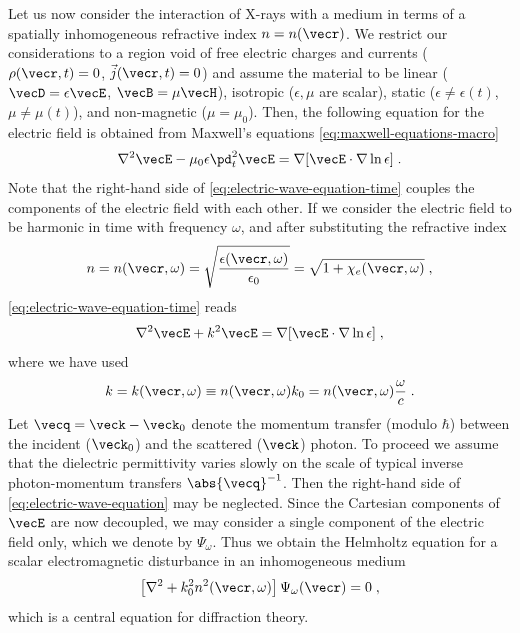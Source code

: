 \documentclass[
twoside,
openright,
titlepage,
numbers=noenddot,
headinclude,
fleqn,
a4paper,
footinclude=true,
cleardoublepage=empty,
abstractoff,
BCOR=5mm,
paper=a4,
fontsize=11pt,
british,ngerman,american,
]{scrreprt}
\begin{document}
Let us now consider the interaction of X-rays with a medium in terms
of a spatially inhomogeneous refractive index $n=n(\vecr)$.  We
restrict our considerations to a region void of free electric charges
and currents ($\rho(\vecr,t)=0$, $\vec{j}(\vecr,t)=0$) and assume the
material to be linear ($\vecD=\epsilon\vecE$, $\vecB=\mu\vecH$),
isotropic ($\epsilon,\mu$ are scalar), static
($\epsilon\neq\epsilon(t)$, $\mu\neq\mu(t)$), and non-magnetic
($\mu=\mu_0$).  Then, the following equation for the electric field is
obtained from Maxwell's equations \eqref{eq:maxwell-equations-macro}
\begin{equation}
  \label{eq:electric-wave-equation-time}
  \nabla^2\vecE-\mu_0\epsilon\pd_t^2\vecE
  = \nabla[\vecE\cdot\nabla\ln\epsilon]\;.
\end{equation}
Note that the right-hand side of \cref{eq:electric-wave-equation-time}
couples the components of the electric field with each other.  If we
consider the electric field to be harmonic in time with frequency
$\omega$, and after substituting the refractive index
\begin{equation}
  \label{eq:refractive-index-epsilon}
  n = n(\vecr,\omega) 
  = \sqrt{\frac{\epsilon(\vecr,\omega)}{\epsilon_0}} 
  = \sqrt{1+\chi_e(\vecr,\omega)} \;,
\end{equation}
\cref{eq:electric-wave-equation-time} reads 
\begin{equation}
  \label{eq:electric-wave-equation}
  \nabla^2\vecE+k^2\vecE
  = \nabla[\vecE\cdot\nabla\ln\epsilon]\;,
\end{equation}
where we have used
\begin{equation}
  \label{eq:wave-vector}
  k = k(\vecr,\omega)
  \equiv n(\vecr,\omega)k_0
  = n(\vecr,\omega)\frac{\omega}{c} \;.
\end{equation}
Let $\vecq = \veck-\veck_0$ denote the momentum transfer (modulo
$\hbar$) between the incident ($\veck_0$) and the scattered ($\veck$)
photon.  To proceed we assume that the dielectric permittivity varies
slowly on the scale of typical inverse photon-momentum transfers
$\abs{\vecq}^{-1}$.  Then the right-hand side of
\cref{eq:electric-wave-equation} may be neglected.  Since the
Cartesian components of $\vecE$ are now decoupled, we may consider a
single component of the electric field only, which we denote by
$\Psi_\omega$.  Thus we obtain the Helmholtz equation for a scalar
electromagnetic disturbance in an inhomogeneous medium
\cite{Jackson,PaganinBook}
\begin{equation}
    \label{eq:helmholtz-inhomo}
    \left[\nabla^2 + k_0^2n^2(\vecr,\omega)\right]\Psi_{\omega}(\vecr)=0\;,
\end{equation}
which is a central equation for  diffraction theory.
\end{document}
